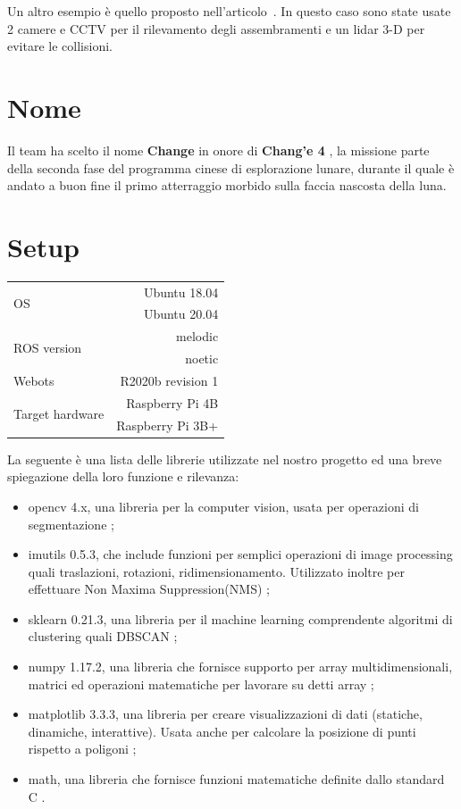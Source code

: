 \documentclass[a4paper]{article}
\begin{document}
	Un altro esempio è quello proposto nell'articolo~\cite{fan2020autonomous}.
	In questo caso sono state usate 2 camere e CCTV per il rilevamento degli
	assembramenti e un lidar 3-D per evitare le collisioni.
	
	\section{Nome}\label{sec:Nome}
	Il team ha scelto il nome \textbf{Change} in onore di \textbf{Chang'e 4}
	\cite{change4}, la missione parte della seconda fase del programma cinese
	di esplorazione lunare, durante il quale è andato a buon fine il primo
	atterraggio morbido sulla faccia nascosta della luna. 
	
	\section{Setup}\label{sec:Setup}
	\begin{tabular}{|l|r|}
		\hline
		\multirow{2}{4em}{OS} & Ubuntu 18.04 \\
							  & Ubuntu 20.04 \\ \hline
		\multirow{2}{6em}{ROS version} & melodic \\
									   & noetic \\ \hline
		Webots & R2020b revision 1\\ \hline
		\multirow{2}{11em}{Target hardware} & Raspberry Pi 4B \\
											& Raspberry Pi 3B+ \\ \hline
	\end{tabular}
	

	La seguente è una lista delle librerie utilizzate nel nostro progetto ed una breve spiegazione della loro funzione e rilevanza:

	\begin{itemize}
		\item opencv 4.x, una libreria per la computer vision, usata per
			operazioni di segmentazione \cite{opencv};
		\item imutils 0.5.3, che include funzioni per semplici operazioni di image
			processing quali traslazioni, rotazioni, ridimensionamento.
			Utilizzato inoltre per effettuare Non Maxima Suppression(NMS)
			\cite{imutils};
		\item sklearn 0.21.3, una libreria per il machine learning comprendente
			algoritmi di clustering quali DBSCAN \cite{scikit};
		\item numpy 1.17.2, una libreria che fornisce supporto per array
			multidimensionali, matrici ed operazioni matematiche per lavorare
			su detti array \cite{numpy};
		\item matplotlib 3.3.3, una libreria per creare visualizzazioni di dati
			(statiche, dinamiche, interattive). Usata anche per calcolare la
			posizione di punti rispetto a poligoni \cite{matplotlib}; 
		\item math, una libreria che fornisce funzioni matematiche definite dallo
			standard C \cite{math}.
	\end{itemize}
\end{document}
